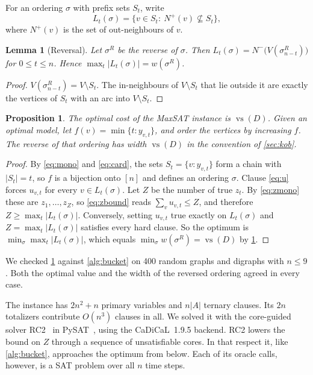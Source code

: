 \documentclass[11pt]{article}
\newtheorem{lemma}[theorem]{Lemma}
\newtheorem{proposition}[theorem]{Proposition}
\theoremstyle{definition}
\newcommand{\Nm}{N^{-}}
\newcommand{\vs}{\operatorname{vs}}
\newcommand{\cost}{w}
\newcommand{\set}[1]{\{#1\}}
\begin{document}
For an ordering $\sigma$ with prefix sets $S_t$, write
\[
L_t(\sigma)=\set{v\in S_t:\ N^{+}(v)\not\subseteq S_t},
\]
where $N^{+}(v)$ is the set of out-neighbours of $v$.

\begin{lemma}[Reversal]\label{lem:rev}
Let $\sigma^{R}$ be the reverse of $\sigma$. Then
$L_t(\sigma)=\Nm\bigl(V(\sigma^{R}_{n-t})\bigr)$ for $0\le t\le n$. Hence
$\max_t|L_t(\sigma)|=\cost(\sigma^{R})$.
\end{lemma}
\begin{proof}
$V(\sigma^{R}_{n-t})=V\setminus S_t$. The in-neighbours of $V\setminus S_t$
that lie outside it are exactly the vertices of $S_t$ with an arc into
$V\setminus S_t$.
\end{proof}

\begin{proposition}\label{prop:maxsat}
The optimal cost of the MaxSAT instance is $\vs(D)$. Given an optimal model,
let $f(v)=\min\set{t:y_{v,t}}$, and order the vertices by increasing $f$.
The reverse of that ordering has width $\vs(D)$ in the convention of
\cref{sec:kob}.
\end{proposition}
\begin{proof}
By \eqref{eq:mono} and \eqref{eq:card}, the sets
$S_t=\set{v:y_{v,t}}$ form a chain with $|S_t|=t$, so $f$ is a bijection
onto $[n]$ and defines an ordering $\sigma$. Clause \eqref{eq:u} forces
$u_{v,t}$ for every $v\in L_t(\sigma)$. Let $Z$ be the number of true
$z_t$. By \eqref{eq:zmono} these are $z_1,\dots,z_Z$, so \eqref{eq:zbound}
reads $\sum_v u_{v,t}\le Z$, and therefore $Z\ge\max_t|L_t(\sigma)|$.
Conversely, setting $u_{v,t}$ true exactly on $L_t(\sigma)$ and
$Z=\max_t|L_t(\sigma)|$ satisfies every hard clause. So the optimum is
$\min_\sigma\max_t|L_t(\sigma)|$, which equals $\min_\sigma
\cost(\sigma^{R})=\vs(D)$ by \cref{lem:rev}.
\end{proof}

We checked \cref{prop:maxsat} against \cref{alg:bucket} on 400 random graphs
and digraphs with $n\le 9$. Both the optimal value and the width of the
reversed ordering agreed in every case.

The instance has $2n^2+n$ primary variables and $n|A|$ ternary clauses. Its
$2n$ totalizers contribute $O(n^3)$ clauses in all. We solved it with the
core-guided solver RC2~\cite{RC2} in PySAT~\cite{PySAT}, using the
CaDiCaL~1.9.5 backend. RC2 lowers the bound on $Z$ through a sequence of
unsatisfiable cores. In that respect it, like \cref{alg:bucket}, approaches
the optimum from below. Each of its oracle calls, however, is a SAT problem
over all $n$ time steps.
\end{document}
